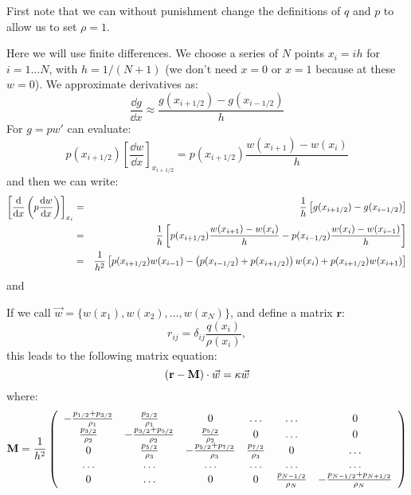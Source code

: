 First note that we can without punishment change the definitions of
$q$ and $p$ to allow us to set $\rho=1$. 

Here we will use finite differences. We choose a series of $N$ points
$x_i = i h $ for $i=1\ldots N$, with $h=1/(N+1)$ (we don't need $x=0$
or $x=1$ because at these $w=0$). We approximate derivatives as:
\begin{equation}
\frac{\dd{g}}{\dd{x}} \approx \frac{g(x_{i+1/2}) - g(x_{i-1/2})}{h}
\end{equation}
For $g=p w'$ can evaluate:
\begin{equation}
p(x_{i+1/2})\left[\frac{\dd{w}}{\dd{x}}\right]_{x_{i+1/2}} =
p(x_{i+1/2}) \frac{w(x_{i+1}) - w(x_i)}{h}
\end{equation}
and then we can write:
\begin{eqnarray}
  \left[\frac{{\rm d}}{{\rm d}x}\left(p\frac{{\rm d}w}{{\rm d}x}\right)\right]_{x_i}
  &=& \frac{1}{h}\left[g(x_{i+1/2}) - g(x_{i-1/2})\right] \cr
  &=& \frac{1}{h}\left[p(x_{i+1/2}) \frac{w(x_{i+1}) - w(x_i)}{h}
    - p(x_{i-1/2}) \frac{w(x_{i}) - w(x_{i-1})}{h}\right] \cr
  &=& \frac{1}{h^2}\left[ p(x_{i+1/2}) w(x_{i-1})
    - \left(p(x_{i-1/2}) + p(x_{i+1/2})\right) w(x_i)
    + p(x_{i+1/2}) w(x_{i+1})\right]
\end{eqnarray}
and 

If we call $\vec{w} = \{w(x_1), w(x_2), \ldots, w(x_N)\}$, and define
a matrix $\mathbf{r}$:
\begin{equation}
r_{ij} = \delta_{ij} \frac{q(x_i)}{\rho(x_i)},
\end{equation}
this leads to the following matrix equation:
\begin{equation}
\left({\bf r} - {\bf M}\right)\cdot\vec{w} = \kappa \vec{w}
\end{equation}
where:
\begin{equation}
  {\bf M} = \frac{1}{h^2} \left(\begin{array}{cccccc}
    - \frac{p_{1/2} + p_{3/2}}{\rho_1} & \frac{p_{3/2}}{\rho_1} & 0 & \ldots & \ldots & 0 \cr
    \frac{p_{3/2}}{\rho_2} & - \frac{p_{3/2} + p_{5/2}}{\rho_2} & \frac{p_{5/2}}{\rho_2} & 0 & \ldots & 0 \cr
    0 & \frac{p_{5/2}}{\rho_3} & - \frac{p_{5/2} + p_{7/2}}{\rho_3} & \frac{p_{7/2}}{\rho_3} & 0 & \ldots \cr
    \ldots & \ldots & \ldots & \ldots & \ldots & \ldots \cr
    0 & \ldots & 0 & 0 & \frac{p_{N-1/2}}{\rho_N}  & - \frac{p_{N-1/2} + p_{N+1/2} }{\rho_N}
\end{array}\right)
\end{equation}

